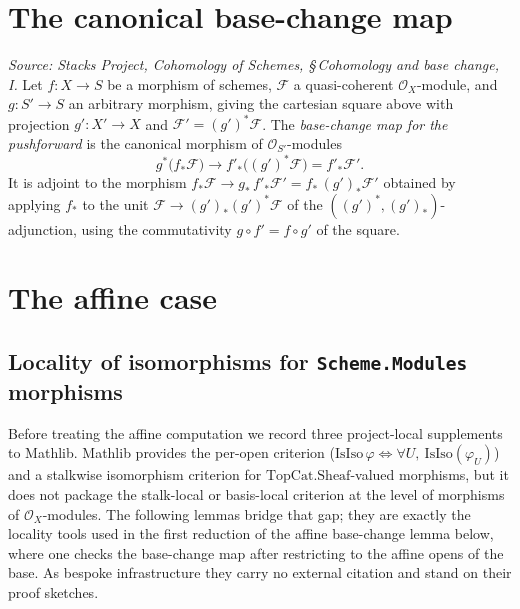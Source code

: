 \section{The canonical base-change map}

\begin{definition}
  \label{def:pushforward_base_change_map}
  \textit{Source: Stacks Project, Cohomology of Schemes, \S\,Cohomology and base
  change, I.}
  Let \(f : X \to S\) be a morphism of schemes, \(\mathcal{F}\) a quasi-coherent
  \(\mathcal{O}_X\)-module, and \(g : S' \to S\) an arbitrary morphism, giving the
  cartesian square above with projection \(g' : X' \to X\) and
  \(\mathcal{F}' = (g')^*\mathcal{F}\). The \emph{base-change map for the
  pushforward} is the canonical morphism of \(\mathcal{O}_{S'}\)-modules
  \[
    g^*\bigl(f_*\mathcal{F}\bigr) \longrightarrow f'_*\bigl((g')^*\mathcal{F}\bigr)
    = f'_*\mathcal{F}' .
  \]
  It is adjoint to the morphism
  \(f_*\mathcal{F} \to g_*\, f'_*\mathcal{F}' = f_*\,(g')_*\mathcal{F}'\) obtained
  by applying \(f_*\) to the unit
  \(\mathcal{F} \to (g')_*(g')^*\mathcal{F}\) of the
  \(((g')^*, (g')_*)\)-adjunction, using the commutativity
  \(g \circ f' = f \circ g'\) of the square.
\end{definition}

\section{The affine case}

\subsection{Locality of isomorphisms for \texttt{Scheme.Modules} morphisms}

Before treating the affine computation we record three project-local supplements
to Mathlib. Mathlib provides the per-open criterion
(\(\mathrm{IsIso}\,\varphi \iff \forall U,\ \mathrm{IsIso}(\varphi_U)\)) and a
stalkwise isomorphism criterion for \(\mathrm{TopCat.Sheaf}\)-valued morphisms, but
it does not package the stalk-local or basis-local criterion at the level of
morphisms of \(\mathcal{O}_X\)-modules. The following lemmas bridge that gap; they
are exactly the locality tools used in the first reduction of the affine
base-change lemma below, where one checks the base-change map after restricting to
the affine opens of the base. As bespoke infrastructure they carry no external
citation and stand on their proof sketches.

